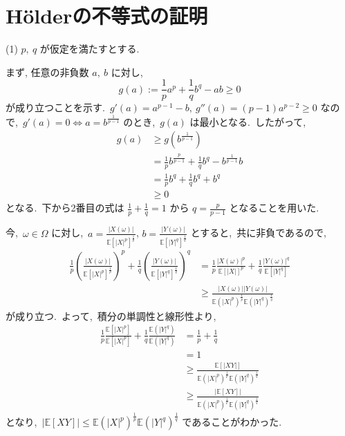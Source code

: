 \documentclass[a4j,11pt]{jarticle}
\theoremstyle{definition}
\begin{document}
\section{H\"olderの不等式の証明}
(1)
$p,\ q$
が仮定を満たすとする. 

まず,  任意の非負数
$a,\ b$
に対し, 
\begin{equation}
  g(a):=\frac{1}{p}a^p + \frac{1}{q}b^q - ab\geq 0
\end{equation}
が成り立つことを示す.\ 
$g'(a) = a^{p-1} - b,\ g''(a)=(p-1)a^{p-2} \geq 0$
なので,\ 
$g'(a) = 0 \Leftrightarrow a = b^{\frac{1}{p-1}}$
のとき,\ 
$g(a)$
は最小となる.\ 
したがって,\ 
\begin{align}
  g(a)
  & \geq g(b^{\frac{1}{p-1}}) \\
  & = \frac{1}{p}b^{\frac{p}{p-1}} + \frac{1}{q}b^q - b^{\frac{1}{p-1}}b \\
  & = \frac{1}{p}b^{q} + \frac{1}{q}b^q + b^q \\
  & \geq 0
\end{align}
となる.\ 
下から2番目の式は
$\frac{1}{p}+\frac{1}{q}=1$
から
$q=\frac{p}{p-1}$
となることを用いた.\ 

今,\ 
$\omega \in \Omega$
に対し,\ 
$a = \frac{|X(\omega)|}{\mathbb{E}[|X|^p]^{\frac{1}{p}}}$,
$b = \frac{|Y(\omega)|}{\mathbb{E}[|Y|^q]^{\frac{1}{q}}}$
とすると,\ 共に非負であるので,\ 
\begin{align}
  \frac{1}{p}\left( \frac{|X(\omega)|}{\mathbb{E}[|X|^p]^{\frac{1}{p}}}\right)^p + \frac{1}{q}\left( \frac{|Y(\omega)|}{\mathbb{E}[|Y|^q]^{\frac{1}{q}}}\right)^q
  & = \frac{1}{p} \frac{|X(\omega)|^p}{\mathbb{E}[|X|]^p} + \frac{1}{q} \frac{|Y(\omega)|^q}{\mathbb{E}[|Y|^q]} \\
  & \geq \frac{|X(\omega)||Y(\omega)|}{\mathbb{E}(|X|^p)^{\frac{1}{p}}\mathbb{E}(|Y|^q)^{\frac{1}{q}}}
\end{align}
が成り立つ.\ 
よって,\ 積分の単調性と線形性より,\ 
\begin{align}
  \frac{1}{p}\frac{\mathbb{E}[|X|^p]}{\mathbb{E}[|X|^p]} + \frac{1}{q}\frac{\mathbb{E}(|Y|^q)}{\mathbb{E}(|Y|^q)}
  & = \frac{1}{p} + \frac{1}{q} \\
  & = 1 \\
  & \geq \frac{\mathbb{E}[|XY|]}{\mathbb{E}(|X|^p)^{\frac{1}{p}}\mathbb{E}(|Y|^q)^{\frac{1}{q}}} \\
  & \geq \frac{|\mathbb{E}[XY]|}{\mathbb{E}(|X|^p)^{\frac{1}{p}}\mathbb{E}(|Y|^q)^{\frac{1}{q}}}
\end{align}
となり,\ 
$|\mathbb{E}[XY]| \leq \mathbb{E}(|X|^p)^{\frac{1}{p}}\mathbb{E}(|Y|^q)^{\frac{1}{q}}$
であることがわかった.\ 
\end{document}

